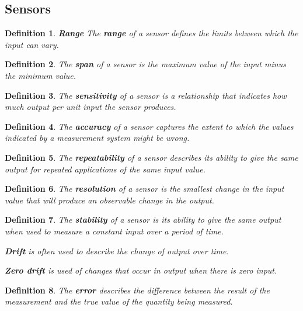 \documentclass[10pt,a4paper]{scrartcl}
\newtheorem{define}{Definition}
\begin{document}
\begin{multicols*}{2}
\section{Sensors}

\begin{define}
\textbf{Range} The \textbf{range} of a sensor defines the limits between which the input can vary.
\end{define}

\begin{define}
The \textbf{span} of a sensor is the maximum value of the input minus the minimum value.
\end{define}

\begin{define}
The \textbf{sensitivity} of a sensor is a relationship that indicates how much output per unit input the sensor produces.
\end{define}

\begin{define}
The \textbf{accuracy} of a sensor captures the extent to which the values indicated by a measurement system might be wrong.
\end{define}

\begin{define}
The \textbf{repeatability} of a sensor describes its ability to give the same output for repeated applications of the same input value.

\end{define}


\begin{define}
The \textbf{resolution} of a sensor is the smallest change in the input value that will produce an observable change in the output.
\end{define}

\begin{define}
The \textbf{stability} of a sensor is its ability to give the same output when used to measure a constant input over a period of time.

\textbf{Drift} is often used to describe the change of output over time.

\textbf{Zero drift} is used of changes that occur in output when there is zero input.
\end{define}

\begin{define}
The \textbf{error} describes the difference between the result of the measurement and the true value of the quantity being measured.
\end{define}


\end{multicols*}
\end{document}
